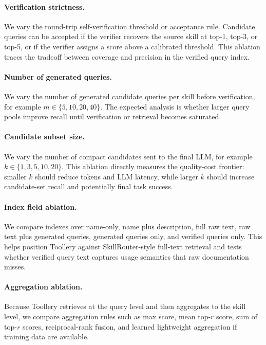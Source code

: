 \documentclass[11pt]{article}
\begin{document}
\paragraph{Verification strictness.}
We vary the round-trip self-verification threshold or acceptance rule. Candidate
queries can be accepted if the verifier recovers the source skill at top-1,
top-3, or top-5, or if the verifier assigns a score above a calibrated
threshold. This ablation traces the tradeoff between coverage and precision in
the verified query index.

\paragraph{Number of generated queries.}
We vary the number of generated candidate queries per skill before verification,
for example $m \in \{5, 10, 20, 40\}$. The expected analysis is whether larger
query pools improve recall until verification or retrieval becomes saturated.

\paragraph{Candidate subset size.}
We vary the number of compact candidates sent to the final LLM, for example
$k \in \{1, 3, 5, 10, 20\}$. This ablation directly measures the quality-cost
frontier: smaller $k$ should reduce tokens and LLM latency, while larger $k$
should increase candidate-set recall and potentially final task success.

\paragraph{Index field ablation.}
We compare indexes over name-only, name plus description, full raw text, raw text
plus generated queries, generated queries only, and verified queries only. This
helps position Toollery against SkillRouter-style full-text retrieval and tests
whether verified query text captures usage semantics that raw documentation
misses.

\paragraph{Aggregation ablation.}
Because Toollery retrieves at the query level and then aggregates to the skill
level, we compare aggregation rules such as max score, mean top-$r$ score, sum of
top-$r$ scores, reciprocal-rank fusion, and learned lightweight aggregation if
training data are available.
\end{document}
